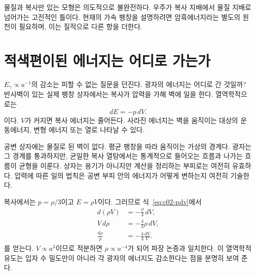 \begin{classroomqa}
\end{classroomqa}

물질과 복사만 있는 모형은 의도적으로 불완전하다. 우주가 복사 지배에서 물질 지배로 넘어가는 고전적인 틀이다. 현재의 가속 팽창을 설명하려면 암흑에너지라는 별도의 원천이 필요하며, 이는 질적으로 다른 항을 더한다.

\section{적색편이된 에너지는 어디로 가는가}

\(E_\gamma\propto a^{-1}\)의 감소는 피할 수 없는 질문을 던진다. 광자의 에너지는 어디로 간 것일까? 반사벽이 있는 실제 팽창 상자에서는 복사가 압력을 가해 벽에 일을 한다. 열역학적으로는
\begin{equation}
dE=-p\,dV.
\label{eq:c02-pdv}
\end{equation}
이다. \(V\)가 커지면 복사 에너지는 줄어든다. 사라진 에너지는 벽을 움직이는 대상의 운동에너지, 변형 에너지 또는 열로 나타날 수 있다.

공변 상자에는 물질로 된 벽이 없다. 평균 팽창을 따라 움직이는 가상의 경계다. 광자는 그 경계를 통과하지만, 균일한 복사 열탕에서는 통계적으로 들어오는 흐름과 나가는 흐름이 균형을 이룬다. 상자는 용기가 아니지만 계산을 정리하는 부피로는 여전히 유효하다. 압력에 따른 일의 법칙은 공변 부피 안의 에너지가 어떻게 변하는지 여전히 기술한다.

복사에서는 \(p=\rho/3\)이고 \(E=\rho V\)이다. 그러므로 식~\eqref{eq:c02-pdv}에서
\begin{align}
d(\rho V)&=-\frac{\rho}{3}\,dV,\\
V\,d\rho&=-\frac{4}{3}\rho\,dV,\\
\frac{d\rho}{\rho}&=-\frac{4}{3}\frac{dV}{V}.
\end{align}
를 얻는다. \(V\propto a^3\)이므로 적분하면 \(\rho\propto a^{-4}\)가 되어 파장 논증과 일치한다. 이 열역학적 유도는 입자 수 밀도만이 아니라 각 광자의 에너지도 감소한다는 점을 분명히 보여 준다.


